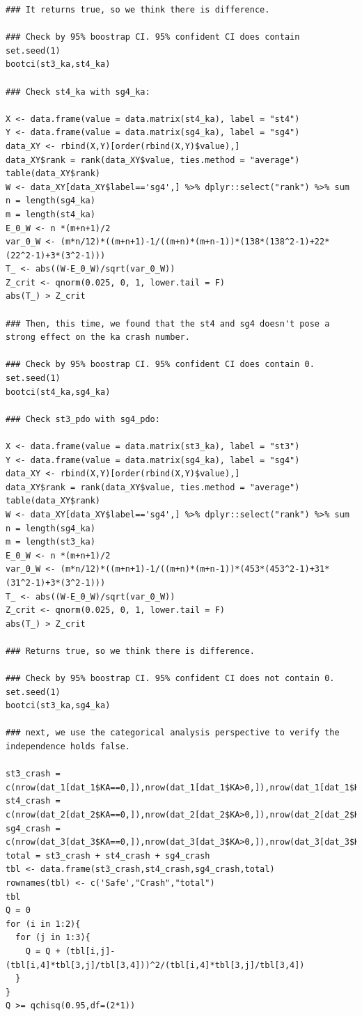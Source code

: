 \documentclass[11pt]{scrartcl} %
\begin{document}
\begin{lstlisting}
### It returns true, so we think there is difference.

### Check by 95% boostrap CI. 95% confident CI does contain
set.seed(1)
bootci(st3_ka,st4_ka)

### Check st4_ka with sg4_ka:

X <- data.frame(value = data.matrix(st4_ka), label = "st4")
Y <- data.frame(value = data.matrix(sg4_ka), label = "sg4")
data_XY <- rbind(X,Y)[order(rbind(X,Y)$value),]
data_XY$rank = rank(data_XY$value, ties.method = "average")
table(data_XY$rank)
W <- data_XY[data_XY$label=='sg4',] %>% dplyr::select("rank") %>% sum
n = length(sg4_ka)
m = length(st4_ka)
E_0_W <- n *(m+n+1)/2
var_0_W <- (m*n/12)*((m+n+1)-1/((m+n)*(m+n-1))*(138*(138^2-1)+22*(22^2-1)+3*(3^2-1)))
T_ <- abs((W-E_0_W)/sqrt(var_0_W))
Z_crit <- qnorm(0.025, 0, 1, lower.tail = F)
abs(T_) > Z_crit

### Then, this time, we found that the st4 and sg4 doesn't pose a strong effect on the ka crash number.

### Check by 95% boostrap CI. 95% confident CI does contain 0.
set.seed(1)
bootci(st4_ka,sg4_ka)

### Check st3_pdo with sg4_pdo:

X <- data.frame(value = data.matrix(st3_ka), label = "st3")
Y <- data.frame(value = data.matrix(sg4_ka), label = "sg4")
data_XY <- rbind(X,Y)[order(rbind(X,Y)$value),]
data_XY$rank = rank(data_XY$value, ties.method = "average")
table(data_XY$rank)
W <- data_XY[data_XY$label=='sg4',] %>% dplyr::select("rank") %>% sum
n = length(sg4_ka)
m = length(st3_ka)
E_0_W <- n *(m+n+1)/2
var_0_W <- (m*n/12)*((m+n+1)-1/((m+n)*(m+n-1))*(453*(453^2-1)+31*(31^2-1)+3*(3^2-1)))
T_ <- abs((W-E_0_W)/sqrt(var_0_W))
Z_crit <- qnorm(0.025, 0, 1, lower.tail = F)
abs(T_) > Z_crit

### Returns true, so we think there is difference.

### Check by 95% boostrap CI. 95% confident CI does not contain 0.
set.seed(1)
bootci(st3_ka,sg4_ka)

### next, we use the categorical analysis perspective to verify the independence holds false.

st3_crash = c(nrow(dat_1[dat_1$KA==0,]),nrow(dat_1[dat_1$KA>0,]),nrow(dat_1[dat_1$KA==0,])+nrow(dat_1[dat_1$KA>0,]))
st4_crash = c(nrow(dat_2[dat_2$KA==0,]),nrow(dat_2[dat_2$KA>0,]),nrow(dat_2[dat_2$KA==0,])+nrow(dat_2[dat_2$KA>0,]))
sg4_crash = c(nrow(dat_3[dat_3$KA==0,]),nrow(dat_3[dat_3$KA>0,]),nrow(dat_3[dat_3$KA==0,])+nrow(dat_3[dat_3$KA>0,]))
total = st3_crash + st4_crash + sg4_crash
tbl <- data.frame(st3_crash,st4_crash,sg4_crash,total)
rownames(tbl) <- c('Safe',"Crash","total")
tbl
Q = 0
for (i in 1:2){
  for (j in 1:3){
    Q = Q + (tbl[i,j]-(tbl[i,4]*tbl[3,j]/tbl[3,4]))^2/(tbl[i,4]*tbl[3,j]/tbl[3,4])
  }
}
Q >= qchisq(0.95,df=(2*1))



\end{lstlisting}
\end{document}
